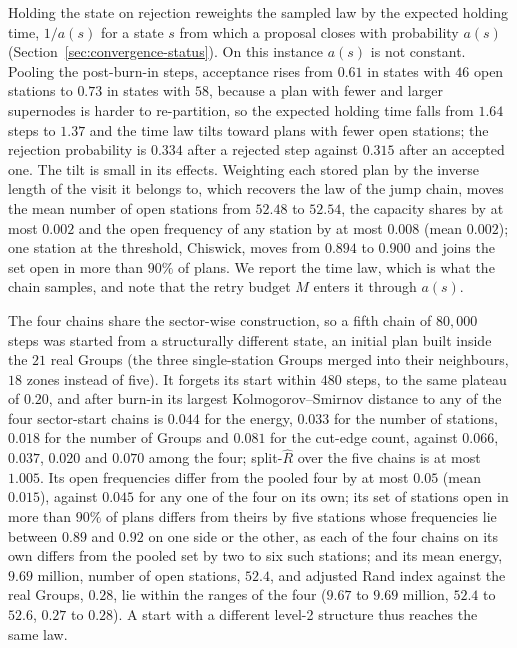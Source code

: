 \documentclass[preprint,12pt,authoryear]{elsarticle}
\theoremstyle{definition}
\begin{document}
Holding the state on rejection reweights the sampled law by the expected holding time, $1/a(s)$ for a state $s$ from which a proposal closes with probability $a(s)$ (Section~\ref{sec:convergence-status}). On this instance $a(s)$ is not constant. Pooling the post-burn-in steps, acceptance rises from $0.61$ in states with $46$ open stations to $0.73$ in states with $58$, because a plan with fewer and larger supernodes is harder to re-partition, so the expected holding time falls from $1.64$ steps to $1.37$ and the time law tilts toward plans with fewer open stations; the rejection probability is $0.334$ after a rejected step against $0.315$ after an accepted one. The tilt is small in its effects. Weighting each stored plan by the inverse length of the visit it belongs to, which recovers the law of the jump chain, moves the mean number of open stations from $52.48$ to $52.54$, the capacity shares by at most $0.002$ and the open frequency of any station by at most $0.008$ (mean $0.002$); one station at the threshold, Chiswick, moves from $0.894$ to $0.900$ and joins the set open in more than $90\%$ of plans. We report the time law, which is what the chain samples, and note that the retry budget $M$ enters it through $a(s)$.

The four chains share the sector-wise construction, so a fifth chain of $80{,}000$ steps was started from a structurally different state, an initial plan built inside the $21$ real Groups (the three single-station Groups merged into their neighbours, $18$ zones instead of five). It forgets its start within $480$ steps, to the same plateau of $0.20$, and after burn-in its largest Kolmogorov--Smirnov distance to any of the four sector-start chains is $0.044$ for the energy, $0.033$ for the number of stations, $0.018$ for the number of Groups and $0.081$ for the cut-edge count, against $0.066$, $0.037$, $0.020$ and $0.070$ among the four; split-$\hat R$ over the five chains is at most $1.005$. Its open frequencies differ from the pooled four by at most $0.05$ (mean $0.015$), against $0.045$ for any one of the four on its own; its set of stations open in more than $90\%$ of plans differs from theirs by five stations whose frequencies lie between $0.89$ and $0.92$ on one side or the other, as each of the four chains on its own differs from the pooled set by two to six such stations; and its mean energy, $9.69$ million, number of open stations, $52.4$, and adjusted Rand index against the real Groups, $0.28$, lie within the ranges of the four ($9.67$ to $9.69$ million, $52.4$ to $52.6$, $0.27$ to $0.28$). A start with a different level-2 structure thus reaches the same law.
\end{document}
